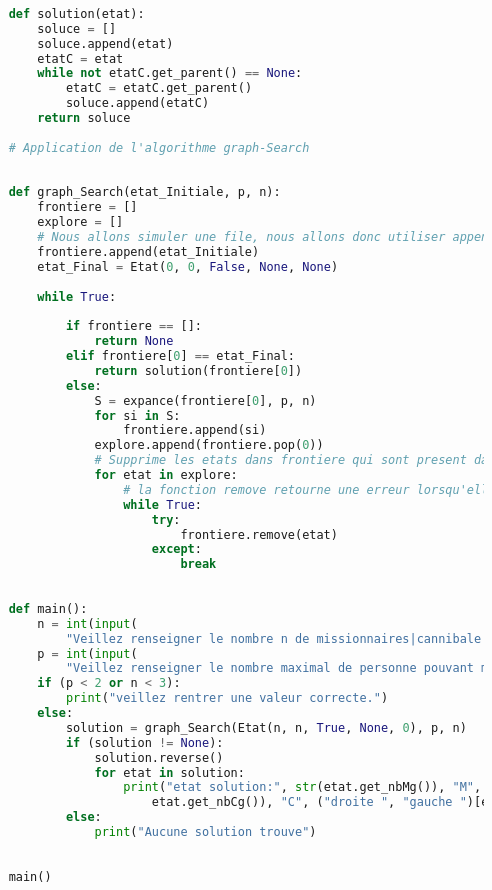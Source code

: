 \documentclass[a4paper, 12pt, french,oneside]{book}
\begin{document}
\begin{lstlisting}[language=Python, caption=Python example]
    
    def solution(etat):
        soluce = []
        soluce.append(etat)
        etatC = etat
        while not etatC.get_parent() == None:
            etatC = etatC.get_parent()
            soluce.append(etatC)
        return soluce
    
    # Application de l'algorithme graph-Search
    
    
    def graph_Search(etat_Initiale, p, n):
        frontiere = []
        explore = []
        # Nous allons simuler une file, nous allons donc utiliser append qui rajoute l'objet en fin de file et l'etat choisie a expancer sera celui en t^te de file (donc a la position 0)
        frontiere.append(etat_Initiale)
        etat_Final = Etat(0, 0, False, None, None)
    
        while True:
    
            if frontiere == []:
                return None
            elif frontiere[0] == etat_Final:
                return solution(frontiere[0])
            else:
                S = expance(frontiere[0], p, n)
                for si in S:
                    frontiere.append(si)
                explore.append(frontiere.pop(0))
                # Supprime les etats dans frontiere qui sont present dans eplorer (donc les etas deja expance)
                for etat in explore:
                    # la fonction remove retourne une erreur lorsqu'elle ne trouve pas l'element a supprimer dans la file. On va donc capter cette erreur pour eviter de faire "while etat in frontiere". Ce qui nous obligerais a chaque fois de parcourire la file pour s'avoir s'il y a un etat correspondant a "etat".
                    while True:
                        try:
                            frontiere.remove(etat)
                        except:
                            break
    
    
    def main():
        n = int(input(
            "Veillez renseigner le nombre n de missionnaires|cannibale a faires traverser (minimum 3): "))
        p = int(input(
            "Veillez renseigner le nombre maximal de personne pouvant monter sur le bateau (au mininimum 2) : "))
        if (p < 2 or n < 3):
            print("veillez rentrer une valeur correcte.")
        else:
            solution = graph_Search(Etat(n, n, True, None, 0), p, n)
            if (solution != None):
                solution.reverse()
                for etat in solution:
                    print("etat solution:", str(etat.get_nbMg()), "M", str(
                        etat.get_nbCg()), "C", ("droite ", "gauche ")[etat.get_boatPosition()], str(etat.get_cout()))
            else:
                print("Aucune solution trouve")
    
    
    main()
    
\end{lstlisting}

\backmatter
\end{document}
